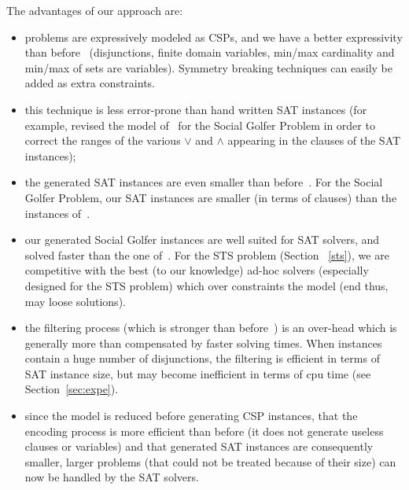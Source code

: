 \documentclass[3p,authoryear,times]{elsarticle}
\begin{document}
The advantages of our approach are:
\begin{itemize}
\item problems are expressively modeled as CSPs, and we have a better expressivity than before~\cite{aor,aisc2014} (disjunctions, finite domain variables, min/max cardinality and min/max of sets are variables). Symmetry breaking techniques can easily be added as extra constraints.

\item this technique is less error-prone than hand written SAT instances (for example, \cite{TriskaMusliu2012} revised the model of~\cite{GentLynce2005} for the Social Golfer Problem  in order to correct the ranges of the various $\vee$ and $\wedge$ appearing in the clauses of the SAT instances);

\item  the generated SAT instances are even smaller than before~\cite{aor}. For the Social Golfer Problem, our SAT instances are smaller (in terms of clauses) than the instances of~\cite{TriskaMusliu2012}. 

\item our generated Social Golfer instances are well suited for SAT solvers, and solved faster than the one of~\cite{TriskaMusliu2012}. For the STS problem (Section ~\ref{sts}), we are competitive with the best (to our knowledge) ad-hoc solvers (especially designed for the STS problem) which over constraints the model (end thus, may loose solutions).

\item the filtering process (which is stronger than before~\cite{aisc2014}) is an over-head which is generally more than compensated by faster solving times. When instances contain a huge number of disjunctions, the filtering is efficient in terms of SAT instance size, but may become inefficient in terms of cpu time (see Section~\ref{sec:expe}).

\item since the model is reduced before generating CSP instances, that the encoding process is more efficient than before (it does not generate useless clauses or variables) and that  generated  SAT instances are consequently smaller, larger problems (that could not be treated because of their size) can now be handled by the SAT solvers.
\end{itemize}
\end{document}
